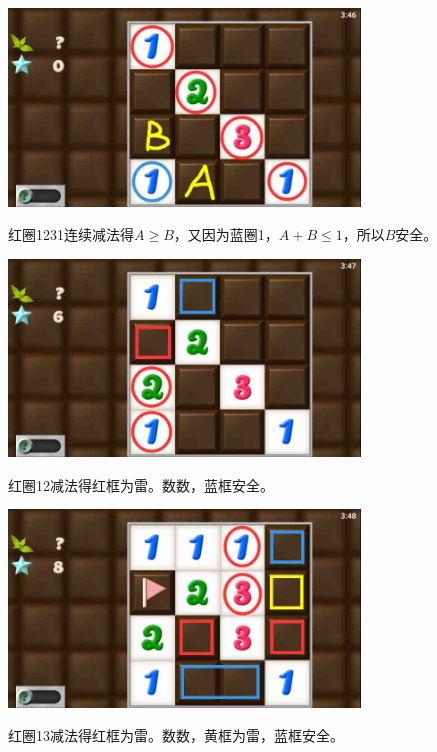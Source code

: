 \subsection{} %
\begin{center}
    \includegraphics[width=0.7\textwidth]{puzzlelow/162-1.jpg}
\end{center}
红圈1231连续减法得$A\ge B$，又因为蓝圈1，$A+B\le 1$，所以$B$安全。
\begin{center}
    \includegraphics[width=0.7\textwidth]{puzzlelow/162-2.jpg}
\end{center}
红圈12减法得红框为雷。数数，蓝框安全。
\begin{center}
    \includegraphics[width=0.7\textwidth]{puzzlelow/162-3.jpg}
\end{center}
红圈13减法得红框为雷。数数，黄框为雷，蓝框安全。

